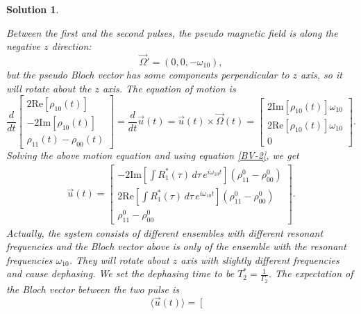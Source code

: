 \documentclass[UTF8,10pt,a4paper]{article}
\theoremstyle{Problem}
\theoremstyle{Solution}
\newtheorem*{sol}{Solution}
\providecommand{\re}[1]{\text{Re}\left[#1\right]}
\providecommand{\im}[1]{\text{Im}\left[#1\right]}
\begin{document}
\begin{sol}
\begin{enumerate}
\begin{equation}
        \end{equation}
        Between the first and the second pulses, the pseudo magnetic field is along the negative $z$ direction:
        \begin{equation}
            \label{PMF-2}
            \vec{\Omega}'=(0,0,-\omega_{10}),
        \end{equation}
        but the pseudo Bloch vector has some components perpendicular to $z$ axis, so it will rotate about the $z$ axis. The equation of motion is
        \begin{equation}
            \frac{d}{dt}\left[\begin{matrix}
                2\re{\rho_{10}(t)}\\
                -2\im{\rho_{10}(t)}\\
                \rho_{11}(t)-\rho_{00}(t)
            \end{matrix}\right]=\frac{d}{dt}\vec{u}(t)=\vec{u}(t)\times\vec{\Omega}(t)=\left[\begin{matrix}
                2\im{\rho_{10}(t)}\omega_{10}\\
                2\re{\rho_{10}(t)}\omega_{10}\\
                0
            \end{matrix}\right].
        \end{equation}
        Solving the above motion equation and using equation \eqref{BV-2}, we get
        \begin{align}
            \vec{u}(t)=\left[\begin{matrix}
                -2\im{\int R_1^*(\tau)\,d\tau\,e^{i\omega_{10}t}}(\rho_{11}^0-\rho_{00}^0)\\
                2\re{\int R_1^*(\tau)\,d\tau\,e^{i\omega_{10}t}}(\rho_{11}^0-\rho_{00}^0)\\
                \rho_{11}^0-\rho_{00}^0
            \end{matrix}\right].
        \end{align}
        Actually, the system consists of different ensembles with different resonant frequencies and the Bloch vector above is only of the ensemble with the resonant frequencies $\omega_{10}$. They will rotate about $z$ axis with slightly different frequencies and cause dephasing. We set the dephasing time to be $T_2^*=\frac{1}{\Gamma_2}$. The expectation of the Bloch vector between the two pulse is
        \begin{equation}
            \langle\vec{u}(t)\rangle=\left[\begin{matrix}

\end{matrix}
\end{equation}
\end{enumerate}
\end{sol}
\end{document}
